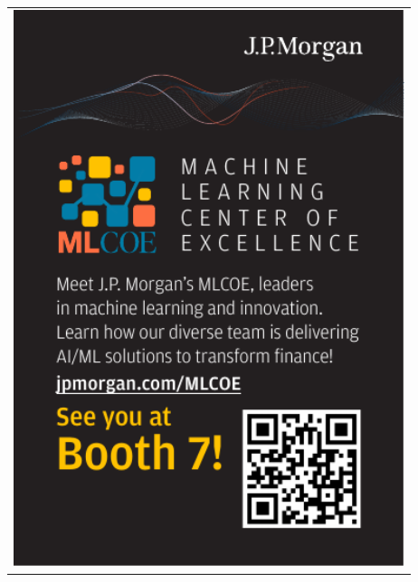 \begin{center}\begin{tabular}{c}
  \includegraphics[width=4.5in]{content/ads/jpmorgan} \\
\end{tabular}\end{center}

\clearpage

